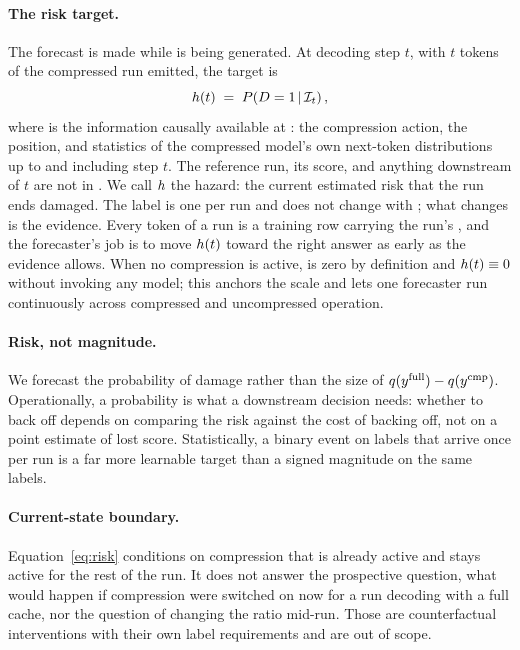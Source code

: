 \paragraph{The risk target.}
The forecast is made while \ycmp{} is being generated. At decoding
step $t$, with $t$ tokens of the compressed run emitted, the target is
\begin{equation}
h(t) \;=\; P\!\left(D = 1 \,\middle|\, \mathcal{I}_t\right),
\label{eq:risk}
\end{equation}
where \info{} is the information causally available at \step: the
compression action, the position, and statistics of the compressed model's
own next-token distributions up to and including step $t$. The reference
run, its score, and anything downstream of $t$ are not in \info.
We call $h$ the hazard: the current estimated risk that the run ends
damaged. The label is one per run and does not change with \step; what changes is the
evidence. Every token of a run is a training row carrying the run's \dmg, and
the forecaster's job is to move $h(t)$ toward the right answer as early
as the evidence allows. When no compression is active, \dmg{} is zero by
definition and $h(t) \equiv 0$ without invoking any model; this anchors
the scale and lets one forecaster run continuously across compressed and
uncompressed operation.

\paragraph{Risk, not magnitude.}
We forecast the probability of damage rather than the size of
$q(y^{\mathrm{full}}) - q(y^{\mathrm{cmp}})$. Operationally, a probability is
what a downstream decision needs: whether to back off depends on comparing
the risk against the cost of backing off, not on a point estimate of lost
score. Statistically, a binary event on labels that arrive once per run is
a far more learnable target than a signed magnitude on the same labels.

\paragraph{Current-state boundary.}
Equation~\ref{eq:risk} conditions on compression that is already active and
stays active for the rest of the run. It does not answer the prospective
question, what would happen if compression were switched on now for a run
decoding with a full cache, nor the question of changing the ratio mid-run.
Those are counterfactual interventions with their own label requirements and
are out of scope.

